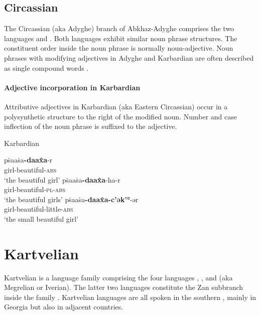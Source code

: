 \subsection{Circassian}
The Circassian (aka Adyghe) branch of Abkhaz-Adyghe comprises the two languages  and . Both languages exhibit similar noun phrase structures. The constituent order inside the noun phrase is normally noun-adjective. Noun phrases with modifying adjectives in Adyghe and Karbardian are often described as single compound words \citep[222]{comrie1981}.

\paragraph*{Adjective incorporation in Karbardian}
Attributive adjectives in Karbardian (aka Eastern Circassian) occur in a polysynthetic structure to the right of the modified noun. Number and case inflection of the noun phrase is suffixed to the adjective.
\begin{exe}
\ex \rm{Karbardian \citep[295]{colarusso1989}}
\begin{xlist}
\ex	
\gll	pṡaaṡa\textbf{-daax̂a}-r\\
	girl-beautiful-\textsc{abs}\\
\glt	‘the beautiful girl’
\ex
\gll	pṡaaṡa\textbf{-daax̂a}-ha-r\\
	girl-beautiful-\textsc{pl}-\textsc{abs}\\
\glt	‘the beautiful girls’
\ex
\gll	pṡaaṡa\textbf{-daax̂a-c'ək'°}-ər\\
	girl-beautiful-little-\textsc{abs}\\
\glt	‘the small beautiful girl’
\end{xlist}
\end{exe}

\section{Kartvelian}
\label{kartvelian synchr}
Kartvelian is a language family comprising the four languages , ,  and  (aka Megrelian or Iverian). The latter two languages constitute the Zan subbranch inside the family \citep[220]{salminen2007}. Kartvelian languages are all spoken in the southern , mainly in Georgia but also in adjacent countries.

